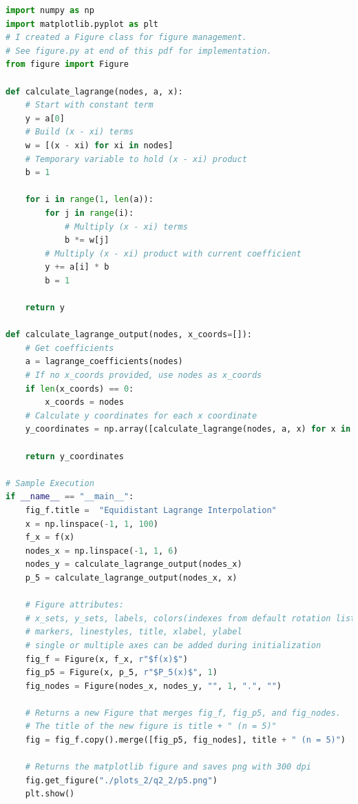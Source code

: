 \documentclass[12pt]{article}
\begin{document}
\begin{lstlisting}[language=Python, caption=2.2 Python]
import numpy as np
import matplotlib.pyplot as plt
# I created a Figure class for figure management.
# See figure.py at end of this pdf for implementation.
from figure import Figure

def calculate_lagrange(nodes, a, x):
    # Start with constant term
    y = a[0]
    # Build (x - xi) terms
    w = [(x - xi) for xi in nodes]
    # Temporary variable to hold (x - xi) product
    b = 1

    for i in range(1, len(a)):
        for j in range(i):
            # Multiply (x - xi) terms
            b *= w[j]
        # Multiply (x - xi) product with current coefficient
        y += a[i] * b
        b = 1

    return y

def calculate_lagrange_output(nodes, x_coords=[]):
    # Get coefficients
    a = lagrange_coefficients(nodes)
    # If no x_coords provided, use nodes as x_coords
    if len(x_coords) == 0:
        x_coords = nodes
    # Calculate y coordinates for each x coordinate
    y_coordinates = np.array([calculate_lagrange(nodes, a, x) for x in x_coords])

    return y_coordinates

# Sample Execution
if __name__ == "__main__":
    fig_f.title =  "Equidistant Lagrange Interpolation"
    x = np.linspace(-1, 1, 100)
    f_x = f(x)
    nodes_x = np.linspace(-1, 1, 6)
    nodes_y = calculate_lagrange_output(nodes_x)
    p_5 = calculate_lagrange_output(nodes_x, x)

    # Figure attributes: 
    # x_sets, y_sets, labels, colors(indexes from default rotation list), 
    # markers, linestyles, title, xlabel, ylabel
    # single or multiple axes can be added during initialization
    fig_f = Figure(x, f_x, r"$f(x)$")
    fig_p5 = Figure(x, p_5, r"$P_5(x)$", 1)
    fig_nodes = Figure(nodes_x, nodes_y, "", 1, ".", "")

    # Returns a new Figure that merges fig_f, fig_p5, and fig_nodes.
    # The title of the new figure is title + " (n = 5)" 
    fig = fig_f.copy().merge([fig_p5, fig_nodes], title + " (n = 5)")

    # Returns the matplotlib figure and saves png with 300 dpi
    fig.get_figure("./plots_2/q2_2/p5.png")
    plt.show()
\end{lstlisting}
\end{document}
